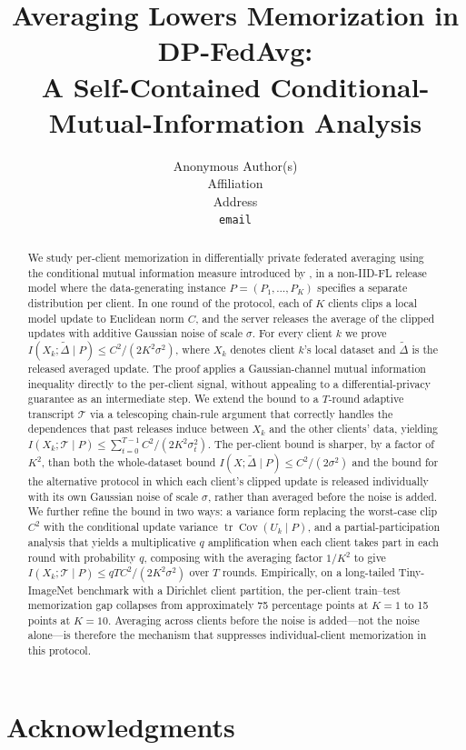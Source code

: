 \documentclass{article}
\title{Averaging Lowers Memorization in DP-FedAvg:\\
A Self-Contained Conditional-Mutual-Information Analysis}
\author{%
  Anonymous Author(s) \\
  Affiliation \\
  Address \\
  \texttt{email}
}
\theoremstyle{plain}
\theoremstyle{definition}
\theoremstyle{remark}
\DeclareMathOperator{\Cov}{Cov}
\DeclareMathOperator{\tr}{tr}
\newcommand{\transcript}{\mathcal{T}}
\newcommand{\noised}{\widetilde{\Delta}}
\begin{document}
\maketitle

\begin{abstract}
We study per-client memorization in differentially private federated averaging using the conditional mutual information measure introduced by \citet{Brown2021Memorization}, in a non-IID-FL release model where the data-generating instance \(P=(P_1,\dots,P_K)\) specifies a separate distribution per client. In one round of the protocol, each of \(K\) clients clips a local model update to Euclidean norm \(C\), and the server releases the average of the clipped updates with additive Gaussian noise of scale \(\sigma\). For every client \(k\) we prove \(I(X_k;\noised\mid P)\le C^2/(2K^2\sigma^2)\), where \(X_k\) denotes client \(k\)'s local dataset and \(\noised\) is the released averaged update. The proof applies a Gaussian-channel mutual information inequality directly to the per-client signal, without appealing to a differential-privacy guarantee as an intermediate step. We extend the bound to a \(T\)-round adaptive transcript \(\transcript\) via a telescoping chain-rule argument that correctly handles the dependences that past releases induce between \(X_k\) and the other clients' data, yielding \(I(X_k;\transcript\mid P)\le \sum_{t=0}^{T-1}C^2/(2K^2\sigma_t^2)\). The per-client bound is sharper, by a factor of \(K^2\), than both the whole-dataset bound \(I(X;\noised\mid P)\le C^2/(2\sigma^2)\) and the bound for the alternative protocol in which each client's clipped update is released individually with its own Gaussian noise of scale \(\sigma\), rather than averaged before the noise is added. We further refine the bound in two ways: a variance form replacing the worst-case clip \(C^2\) with the conditional update variance \(\tr\Cov(U_k\mid P)\), and a partial-participation analysis that yields a multiplicative \(q\) amplification when each client takes part in each round with probability \(q\), composing with the averaging factor \(1/K^2\) to give \(I(X_k;\transcript\mid P)\le qTC^2/(2K^2\sigma^2)\) over \(T\) rounds. Empirically, on a long-tailed Tiny-ImageNet benchmark with a Dirichlet client partition, the per-client train--test memorization gap collapses from approximately 75 percentage points at \(K=1\) to 15 points at \(K=10\). Averaging across clients before the noise is added---not the noise alone---is therefore the mechanism that suppresses individual-client memorization in this protocol.
\end{abstract}










\section*{Acknowledgments}



\end{document}
